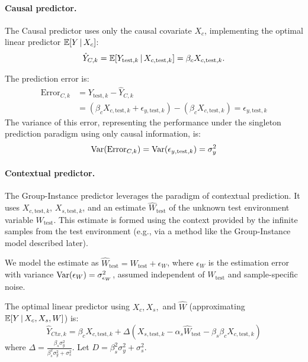 \documentclass[../thesis.tex]{subfiles}
\begin{document}
\paragraph{Causal predictor.} The Causal predictor uses only the causal covariate $X_c$, implementing the optimal linear predictor $\mathbb{E}[Y \,|\, X_c]$:
\[ \hat{Y}_{C,k} = \mathbb{E}[Y_{\text{test},k} \,|\, X_{c,\text{test},k}] = \beta_c X_{c,\text{test},k} .\]

The prediction error is:
\begin{align*}
    \text{Error}_{C,k} &= Y_{\text{test},k} - \hat{Y}_{C,k} \\
    &= (\beta_c X_{c,\text{test},k} + \epsilon_{y,\text{test},k}) - (\beta_c X_{c,\text{test},k}) = \epsilon_{y,\text{test},k}
\end{align*}
The variance of this error, representing the performance under the singleton prediction paradigm using only causal information, is:
\begin{equation}
    \mathrm{Var}(\text{Error}_{C,k}) = \mathrm{Var}(\epsilon_{y,\text{test},k}) = \sigma_y^2
    \label{eq:causal_var_thesis}
\end{equation}

\paragraph{Contextual predictor.} The Group-Instance predictor leverages the paradigm of contextual prediction. It uses $X_{c,\text{test},k}$, $X_{s,\text{test},k}$, and an estimate $\hat{W}_{\text{test}}$ of the unknown test environment variable $W_{\text{test}}$. This estimate is formed using the context provided by the infinite samples from the test environment (e.g., via a method like the Group-Instance model described later).

We model the estimate as $\hat{W}_{\text{test}} = W_{\text{test}} + \epsilon_W$, where $\epsilon_W$ is the estimation error with variance $\mathrm{Var}(\epsilon_W) = \sigma_{\epsilon_W}^2$, assumed independent of $W_{\text{test}}$ and sample-specific noise.

The optimal linear predictor using $X_c, X_s,$ and $\hat{W}$ (approximating $\mathbb{E}[Y \,|\, X_c, X_s, W]$) is:
\[ \hat{Y}_{Ctx,k} = \beta_c X_{c,\text{test},k} + \Delta (X_{s,\text{test},k} - \alpha_s \hat{W}_{\text{test}} - \beta_s \beta_c X_{c,\text{test},k}) \]
where $\Delta = \frac{\beta_s \sigma_y^2}{\beta_s^2 \sigma_y^2 + \sigma_s^2}$. Let $D = \beta_s^2 \sigma_y^2 + \sigma_s^2$.
\end{document}
